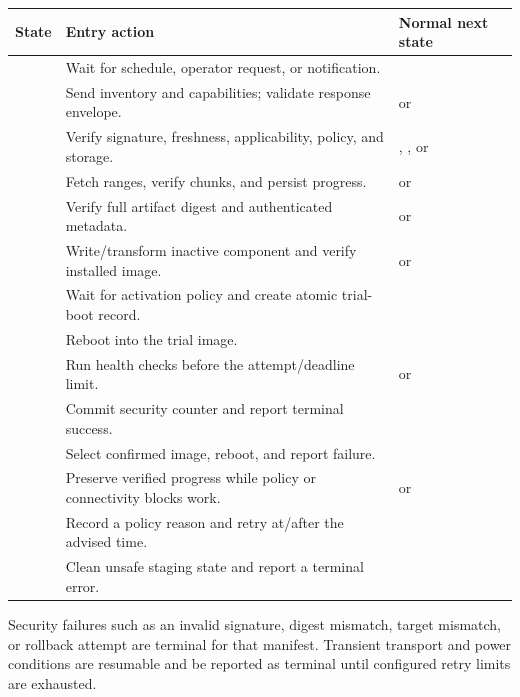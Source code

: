 \begin{longtable}{@{}L{29mm}L{75mm}L{48mm}@{}}
  \toprule
  \textbf{State} & \textbf{Entry action} & \textbf{Normal next state} \\
  \midrule
  \endhead
   & Wait for schedule, operator request, or notification. &
     \\
   & Send inventory and capabilities; validate response envelope. &
     or  \\
   & Verify signature, freshness, applicability, policy, and storage. &
    , , or  \\
   & Fetch ranges, verify chunks, and persist progress. &
     or  \\
   & Verify full artifact digest and authenticated metadata. &
     or  \\
   & Write/transform inactive component and verify installed image. &
     or  \\
   & Wait for activation policy and create atomic trial-boot record. &
     \\
   & Reboot into the trial image. &  \\
   & Run health checks before the attempt/deadline limit. &
     or  \\
   & Commit security counter and report terminal success. &
     \\
   & Select confirmed image, reboot, and report failure. &
     \\
   & Preserve verified progress while policy or connectivity blocks work. &
     or  \\
   & Record a policy reason and retry at/after the advised time. &
     \\
   & Clean unsafe staging state and report a terminal error. &
     \\
  \bottomrule
\end{longtable}

Security failures such as an invalid signature, digest mismatch, target mismatch,
or rollback attempt are terminal for that manifest. Transient transport and power
conditions are resumable and \mustnot be reported as terminal until configured
retry limits are exhausted.

